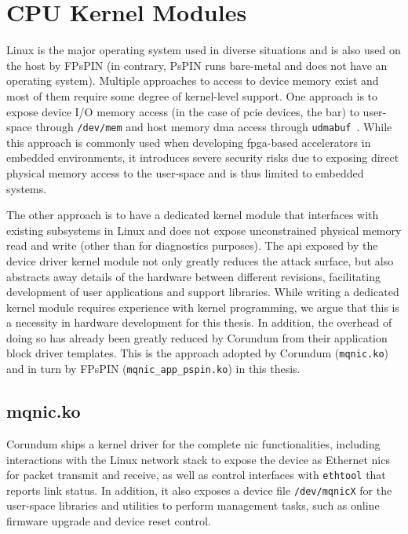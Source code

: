 \section{CPU Kernel Modules} \label{sec:sw-kmod}

Linux is the major operating system used in diverse situations and is also used on the host by FPsPIN (in contrary, PsPIN runs bare-metal and does not have an operating system).  Multiple approaches to access to device memory exist and most of them require some degree of kernel-level support.  One approach is to expose device I/O memory access (in the case of \ac{pcie} devices, the \ac{bar}) to user-space through \texttt{/dev/mem} and host memory \ac{dma} access through \texttt{udmabuf}~\cite{ichiro_u-dma-bufuser_2023}.  While this approach is commonly used when developing \ac{fpga}-based accelerators in embedded environments, it introduces severe security risks due to exposing direct physical memory access to the user-space and is thus limited to embedded systems.

The other approach is to have a dedicated kernel module that interfaces with existing subsystems in Linux and does not expose unconstrained physical memory read and write (other than for diagnostics purposes).  The \ac{api} exposed by the device driver kernel module not only greatly reduces the attack surface, but also abstracts away details of the hardware between different revisions, facilitating development of user applications and support libraries.  While writing a dedicated kernel module requires experience with kernel programming, we argue that this is a necessity in hardware development for this thesis.  In addition, the overhead of doing so has already been greatly reduced by Corundum from their application block driver templates.  This is the approach adopted by Corundum (\texttt{mqnic.ko}) and in turn by FPsPIN (\texttt{mqnic\_\-app\_\-pspin.ko}) in this thesis.  

\subsection{mqnic.ko}

Corundum ships a kernel driver for the complete \ac{nic} functionalities, including interactions with the Linux network stack to expose the device as Ethernet \ac{nic}s for packet transmit and receive, as well as control interfaces with \texttt{ethtool} that reports link status.  In addition, it also exposes a device file \texttt{/dev/mqnicX} for the user-space libraries and utilities to perform management tasks, such as online firmware upgrade and device reset control.


